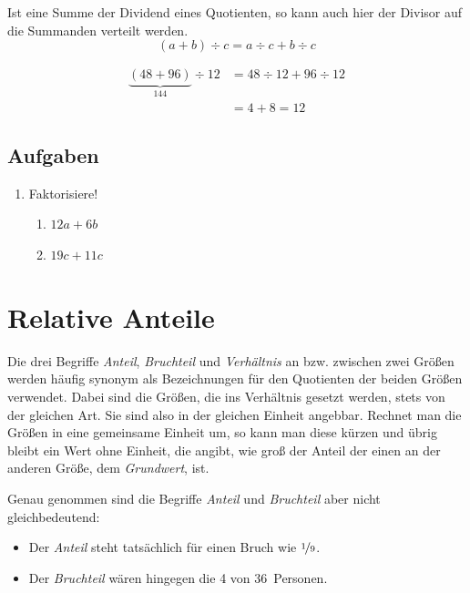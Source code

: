 \begin{regel}
 Ist eine Summe der Dividend eines Quotienten, so kann auch hier der Divisor auf die Summanden verteilt werden.
 \[(a+b)\div c = a\div c + b \div c\]
\end{regel}

\begin{bsp}
 \begin{align*}
  \underbrace{(48+96)}_{144} \div 12 &= 48\div 12 + 96\div 12 \\
                 &= 4 + 8 = 12
 \end{align*}

\end{bsp}

\begin{regel}

\end{regel}



\subsection*{Aufgaben}

\begin{enumerate}
 \item Faktorisiere!
 \begin{enumerate}
  \item \(12a+6b\) 
  \item \(19c+11c\)
 \end{enumerate}

\end{enumerate}

\section{Relative Anteile}

\begin{defi}\label{D:Anteil}
 Die drei Begriffe \emph{Anteil}, \emph{Bruchteil} und \emph{Verhältnis} an bzw. zwischen zwei Größen werden häufig synonym als Bezeichnungen für den Quotienten der beiden Größen verwendet. Dabei sind die Größen, die ins Verhältnis gesetzt werden, stets von der gleichen Art. Sie sind also in der gleichen Einheit angebbar. Rechnet man die Größen in eine gemeinsame Einheit um, so kann man diese kürzen und übrig bleibt ein Wert ohne Einheit, die angibt, wie groß der Anteil der einen an der anderen Größe, dem \emph{Grundwert}, ist.
 
 Genau genommen sind die Begriffe \emph{Anteil} und \emph{Bruchteil} aber nicht gleichbedeutend:
 \begin{itemize}
  \item Der \emph{Anteil} steht tatsächlich für einen Bruch wie \(\nicefrac{1}{9}\).
  \item Der \emph{Bruchteil} wären hingegen die 4 von 36~Personen.
 \end{itemize}

\end{defi}

